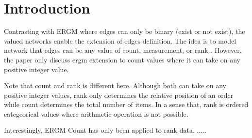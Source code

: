 \documentclass[12pt,a4paper,twoside,openany]{book}
\begin{document}


\chapter{Introduction}
Contrasting with ERGM where edges can only be binary (exist or not exist), the valued networks enable the extension of edges definition. The idea is to model network that edges can be any value of count, measurement, or rank \citep{countergmdefined}. However, the paper only discuss ergm extension to count values where it can take on any positive integer value. 

Note that count and rank is different here. Although both can take on any positive integer values, rank only determines the relative position of an order while count determines the total number of items. In a sense that, rank is ordered categeorical values where arithmetic operation is not possible.

Interestingly, ERGM Count has only been applied to rank data. .....
{}

\end{document}
